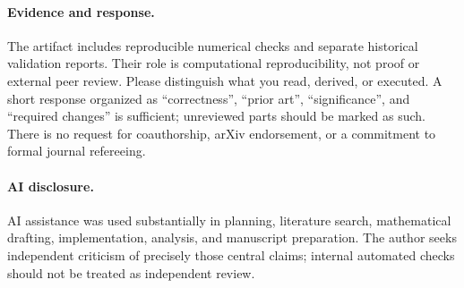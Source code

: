 \documentclass[11pt]{article}
\begin{document}
\paragraph{Evidence and response.}
The artifact includes reproducible numerical checks and separate historical
validation reports. Their role is computational reproducibility, not
proof or external peer review. Please distinguish what you read, derived,
or executed. A short response organized as ``correctness'', ``prior art'',
``significance'', and ``required changes'' is sufficient; unreviewed parts
should be marked as such. There is no request for coauthorship, arXiv
endorsement, or a commitment to formal journal refereeing.

\paragraph{AI disclosure.}
AI assistance was used substantially in planning, literature search,
mathematical drafting, implementation, analysis, and manuscript preparation.
The author seeks independent criticism of precisely those central claims;
internal automated checks should not be treated as independent review.
\end{document}
